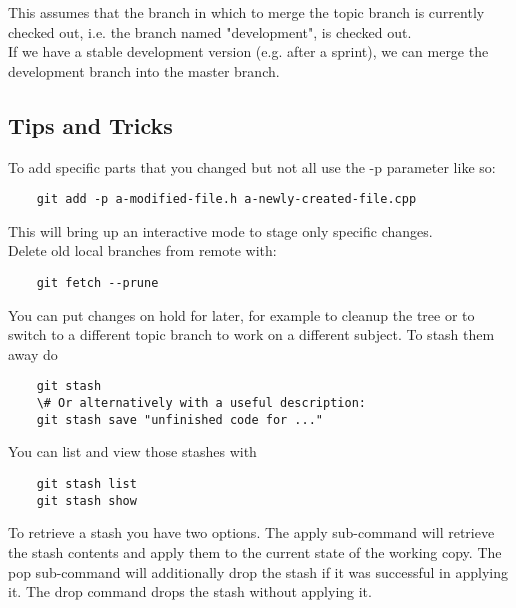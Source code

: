 \documentclass[twoside,12pt,a4paper]{article}
\begin{document}
This assumes that the branch in which to merge the topic branch is currently checked out, i.e. the branch named "development", is checked out. \\
%
If we have a stable development version (e.g. after a sprint), we can merge the development branch into the master branch.


\subsection{Tips and Tricks}
\label{sub:tips_and_tricks}

To add specific parts that you changed but not all use the -p parameter like so:

\begin{lstlisting}
	git add -p a-modified-file.h a-newly-created-file.cpp
\end{lstlisting}

This will bring up an interactive mode to stage only specific changes. \\

Delete old local branches from remote with:

\begin{lstlisting}
	git fetch --prune
\end{lstlisting} 
\vspace*{0.5cm}

You can put changes on hold for later, for example to cleanup the tree or to switch to a different topic branch to work on a different subject. To stash them away do

\begin{lstlisting}
	git stash
	\# Or alternatively with a useful description:
	git stash save "unfinished code for ..."
\end{lstlisting}
\vspace*{0.25cm}

You can list and view those stashes with

\begin{lstlisting}
	git stash list
	git stash show
\end{lstlisting}
\vspace*{0.25cm}

To retrieve a stash you have two options. The apply sub-command will retrieve the stash contents and apply them to the current state of the working copy. The pop sub-command will additionally drop the stash if it was successful in applying it. The drop command drops the stash without applying it.
\end{document}
